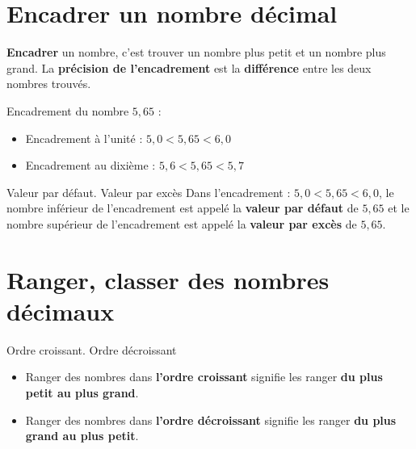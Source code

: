 \begin{pageCours}

\section{Encadrer un nombre décimal}

\begin{Def}
\textbf{Encadrer} un nombre, c'est trouver un nombre plus petit et un nombre plus grand. La \textbf{précision de l'encadrement} est la \textbf{différence} entre les deux nombres trouvés.
\end{Def}

\begin{Ex}
Encadrement du nombre $5,65$ :
 \begin{itemize}[leftmargin=*]
\item Encadrement à l'unité : \(5,0 < 5,65< 6,0\)

\item Encadrement au dixième : \(5,6 < 5,65< 5,7\)
 \end{itemize}
\end{Ex}


\begin{DefT}{Valeur par défaut.  Valeur par excès}
Dans l'encadrement  : \(5,0 < 5,65 < 6,0\), le nombre inférieur de l'encadrement est appelé la \textbf{valeur par défaut} de $5,65$ et le nombre supérieur de l'encadrement est appelé la \textbf{valeur par excès} de $5,65$.
\end{DefT}



\section{Ranger, classer des nombres décimaux}

\begin{DefT}{Ordre croissant. Ordre décroissant}
\begin{itemize}[leftmargin=*]
\item Ranger des nombres dans \textbf{l'ordre croissant} signifie les ranger \textbf{du plus petit au plus grand}.
\item Ranger des nombres dans \textbf{l'ordre décroissant} signifie les ranger \textbf{du plus grand au plus petit}.
\end{itemize}
\end{DefT}

\end{pageCours}


